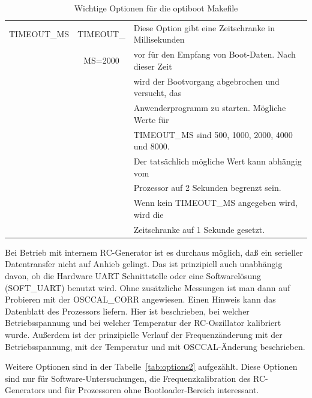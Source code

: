 \begin{table}[H]
\begin{center}
\begin{tabular}{| c | c | l |}
    \hline
 TIMEOUT\_MS       & TIMEOUT\_      & Diese Option gibt eine Zeitschranke in Millisekunden \\
                   &  MS=2000       & vor für den Empfang von Boot-Daten. Nach dieser Zeit\\
                   &                & wird der Bootvorgang abgebrochen und versucht, das \\
                   &                & Anwenderprogramm zu starten. Mögliche Werte für \\
                   &                & TIMEOUT\_MS sind 500, 1000, 2000, 4000 und 8000. \\
                   &                & Der tatsächlich mögliche Wert kann abhängig vom \\
                   &                & Prozessor auf 2 Sekunden begrenzt sein. \\
                   &                & Wenn kein TIMEOUT\_MS angegeben wird, wird die \\
                   &                & Zeitschranke auf 1 Sekunde gesetzt. \\
    \hline
    \end{tabular}
  \end{center}
  \caption{Wichtige Optionen für die optiboot Makefile}
  \label{tab:options1}
\end{table}

Bei Betrieb mit internem RC-Generator ist es durchaus möglich, daß ein serieller Datentransfer
nicht auf Anhieb gelingt. Das ist prinzipiell auch unabhängig davon, ob die Hardware UART
Schnittstelle oder eine Softwarelösung (SOFT\_UART) benutzt wird. Ohne zusätzliche Messungen
ist man dann auf Probieren mit der OSCCAL\_CORR angewiesen. Einen Hinweis kann
das Datenblatt des Prozessors liefern. Hier ist beschrieben, bei welcher Betriebsspannung
und bei welcher Temperatur der RC-Oszillator kalibriert wurde. Außerdem ist der
prinzipielle Verlauf der Frequenzänderung mit der Betriebsspannung, mit der Temperatur und
mit OSCCAL-Änderung beschrieben. 


Weitere Optionen sind in der Tabelle~\ref{tab:options2} aufgezählt. 
Diese Optionen sind nur für Software-Untersuchungen, die Frequenzkalibration des RC-Generators
 und für Prozessoren ohne Bootloader-Bereich interessant.

